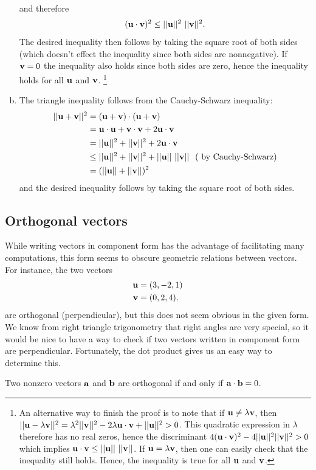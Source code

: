 \documentclass[12pt,letterpaper,reqno]{article}
\numberwithin{equation}{section}
\begin{document}
\begin{pf}
\begin{enumerate}[(a)]
and therefore
\begin{align*}
	({\bf u} \cdot {\bf v})^2 \leq ||{\bf u}||^2 \ ||{\bf v}||^2.
\end{align*}
The desired inequality then follows by taking the square root of both sides (which doesn't effect the inequality since both sides are nonnegative). If ${\bf v}=0$ the inequality also holds since both sides are zero, hence the inequality holds for all ${\bf u}$ and ${\bf v}$. \footnote{An alternative way to finish the proof is to note that if ${\bf u} \neq \lambda {\bf v}$, then $||{\bf u}-\lambda{\bf v}||^2=\lambda^2||{\bf v}||^2-2\lambda {\bf u}\cdot {\bf v}+||{\bf u}||^2>0$. This quadratic expression in $\lambda$ therefore has no real zeros, hence the discriminant $4({\bf u}\cdot {\bf v})^2-4||{\bf u}||^2||{\bf v}||^2>0$ which implies ${\bf u}\cdot {\bf v} \leq ||{\bf u}|| \ ||{\bf v}||$. If ${\bf u}=\lambda {\bf v}$, then one can easily check that the inequality still holds. Hence, the inequality is true for all ${\bf u}$ and ${\bf v}$.}
\item The triangle inequality follows from the Cauchy-Schwarz inequality:
\begin{align*}
	||{\bf u}+{\bf v}||^2&=({\bf u}+{\bf v})\cdot ({\bf u}+{\bf v}) \\
	&={\bf u} \cdot {\bf u}+{\bf v}\cdot {\bf v} +2{\bf u} \cdot {\bf v} \\
	&=||{\bf u}||^2+||{\bf v}||^2+2{\bf u} \cdot {\bf v} \\
	&\leq ||{\bf u}||^2+||{\bf v}||^2+||{\bf u}|| \ ||{\bf v}|| \hspace{0.25cm} (\text{ by Cauchy-Schwarz})\\
	&=(||{\bf u}||+||{\bf v}||)^2
\end{align*}
and the desired inequality follows by taking the square root of both sides.
	\end{enumerate}
\end{pf}


\subsection{Orthogonal vectors}
While writing vectors in component form has the advantage of facilitating many computations, this form seems to obscure geometric relations between vectors.
For instance, the two vectors
\begin{align*}
	{\bf u}&=(3,-2,1) \\
	{\bf v}&=(0,2,4).
\end{align*}
are orthogonal (perpendicular), but this does not seem obvious in the given form. We know from right triangle trigonometry that right angles are very special, so it would be nice to have a way to check if two vectors written in component form are perpendicular. Fortunately, the dot product gives us an easy way to determine this. 
\begin{prop}\label{prop:orthogonal_vectors}
	Two nonzero vectors ${\bf a}$ and ${\bf b}$ are orthogonal if and only if ${\bf a}\cdot {\bf b}=0$.
\end{prop}
\end{document}
